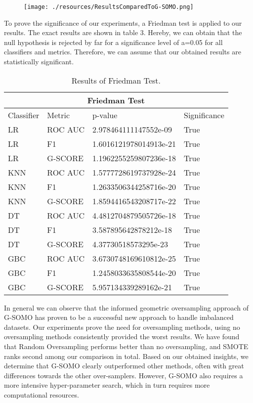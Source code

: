 \documentclass[parskip=full]{scrartcl}
\begin{document}
\begin{figure}[H]
	\centering
	\texttt{[image: ./resources/ResultsComparedToG-SOMO.png]}
	\label{fig:AvgScore}
\end{figure}

To prove the significance of our experiments, a Friedman test is applied to our
results. The exact results are shown in table 3. Hereby, we can obtain that the
null hypothesis is rejected by far for a significance level of a=0.05 for all
classifiers and metrics. Therefore, we can assume that our obtained results are
statistically significant. 

\begin{table} [h]
   \scriptsize
   \centering

\begin{tabular}{ |p{2cm}||p{2cm}|p{4cm}|p{2cm}|  }  
 \hline
 \multicolumn{4}{|c|}{Friedman Test} \\
 \hline
Classifier & Metric & p-value & Significance \\
 \hline
 
LR&	ROC AUC&	2.978464111147552e-09&	True\\
LR&	F1&	1.6016121978014913e-21&	True\\
LR&	G-SCORE&	1.1962255259807236e-18&	True\\
KNN&	ROC AUC&	1.5777728619737928e-24&	True\\
KNN&	F1&	1.2633506344258716e-20&	True\\
KNN&	G-SCORE&	1.8594416543208717e-22&	True\\
DT&	ROC AUC&	4.4812704879505726e-18&	True\\
DT&	F1&	3.587895642878212e-18&	True\\
DT&	G-SCORE&	4.37730518573295e-23&	True\\
GBC&	ROC AUC&	3.6730748169610812e-25&	True\\
GBC&	F1&	1.2458033635808544e-20&	True\\
GBC&	G-SCORE&	5.957134339289162e-21&	True\\

 \hline
\end{tabular}

\caption{Results of Friedman Test.}
   \label{tab:test}
\end{table} 

In general we can observe that the informed geometric oversampling approach of
G-SOMO has proven to be a successful new approach to handle imbalanced datasets.
Our experiments prove the need for oversampling methods, using no oversampling
methods consistently provided the worst results. We have found that Random
Oversampling performs better than no oversampling, and SMOTE ranks second among
our comparison in total. Based on our obtained insights, we determine that
G-SOMO clearly outperformed other methods, often with great differences towards
the other over-samplers. However, G-SOMO also requires a more intensive
hyper-parameter search, which in turn requires more computational resources. 
\end{document}

